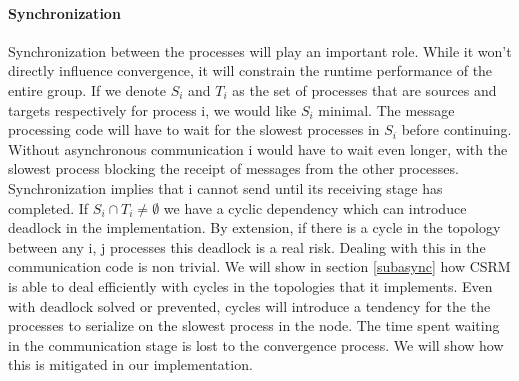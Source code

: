 \paragraph{Synchronization}
Synchronization between the processes will play an important role. While it won't directly influence convergence, it will constrain the runtime performance of the entire group. If we denote $S_i$ and $T_i$ as the set of processes that are sources and targets respectively for process i, we would like $S_i$ minimal. The message processing code will have to wait for the slowest processes in $S_i$ before continuing. Without asynchronous communication i would have to wait even longer, with the slowest process blocking the receipt of messages from the other processes. Synchronization implies that i cannot send until its receiving stage has completed. If $S_i \cap T_i \neq \emptyset$ we have a cyclic dependency which can introduce deadlock in the implementation. By extension, if there is a cycle in the topology between any i, j processes this deadlock is a real risk. Dealing with this in the communication code is non trivial. We will show in section \ref{subasync} how CSRM is able to deal efficiently with cycles in the topologies that it implements. Even with deadlock solved or prevented, cycles will introduce a tendency for the the processes to serialize on the slowest process in the node. The time spent waiting in the communication stage is lost to the convergence process. We will show how this is mitigated in our implementation.
